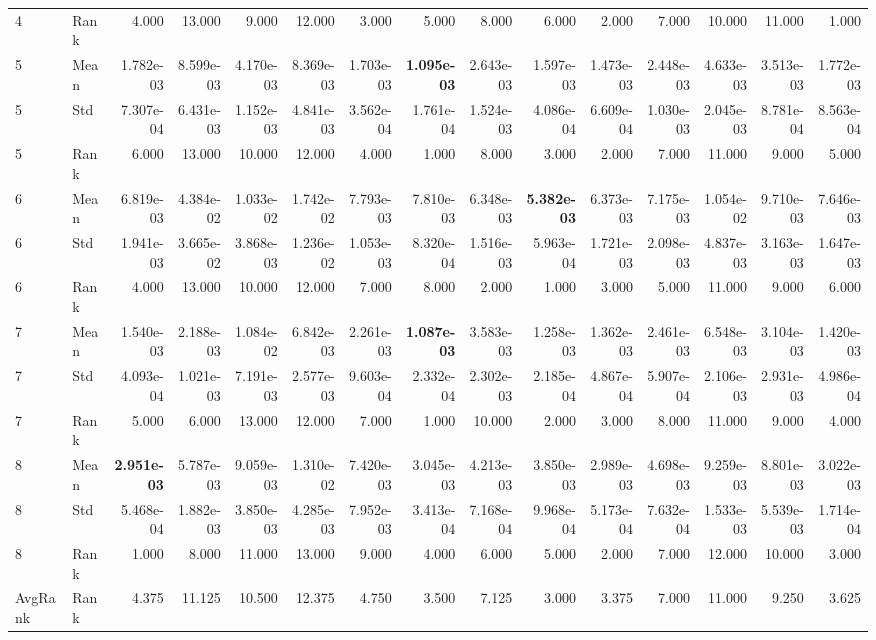 \begin{table}[t]
\begin{tabular}{llrrrrrrrrrrrrr}
4 & Rank & 4.000 & 13.000 & 9.000 & 12.000 & 3.000 & 5.000 & 8.000 & 6.000 & 2.000 & 7.000 & 10.000 & 11.000 & 1.000 \\
5 & Mean & 1.782e-03 & 8.599e-03 & 4.170e-03 & 8.369e-03 & 1.703e-03 & \textbf{1.095e-03} & 2.643e-03 & 1.597e-03 & 1.473e-03 & 2.448e-03 & 4.633e-03 & 3.513e-03 & 1.772e-03 \\
5 & Std & 7.307e-04 & 6.431e-03 & 1.152e-03 & 4.841e-03 & 3.562e-04 & 1.761e-04 & 1.524e-03 & 4.086e-04 & 6.609e-04 & 1.030e-03 & 2.045e-03 & 8.781e-04 & 8.563e-04 \\
5 & Rank & 6.000 & 13.000 & 10.000 & 12.000 & 4.000 & 1.000 & 8.000 & 3.000 & 2.000 & 7.000 & 11.000 & 9.000 & 5.000 \\
6 & Mean & 6.819e-03 & 4.384e-02 & 1.033e-02 & 1.742e-02 & 7.793e-03 & 7.810e-03 & 6.348e-03 & \textbf{5.382e-03} & 6.373e-03 & 7.175e-03 & 1.054e-02 & 9.710e-03 & 7.646e-03 \\
6 & Std & 1.941e-03 & 3.665e-02 & 3.868e-03 & 1.236e-02 & 1.053e-03 & 8.320e-04 & 1.516e-03 & 5.963e-04 & 1.721e-03 & 2.098e-03 & 4.837e-03 & 3.163e-03 & 1.647e-03 \\
6 & Rank & 4.000 & 13.000 & 10.000 & 12.000 & 7.000 & 8.000 & 2.000 & 1.000 & 3.000 & 5.000 & 11.000 & 9.000 & 6.000 \\
7 & Mean & 1.540e-03 & 2.188e-03 & 1.084e-02 & 6.842e-03 & 2.261e-03 & \textbf{1.087e-03} & 3.583e-03 & 1.258e-03 & 1.362e-03 & 2.461e-03 & 6.548e-03 & 3.104e-03 & 1.420e-03 \\
7 & Std & 4.093e-04 & 1.021e-03 & 7.191e-03 & 2.577e-03 & 9.603e-04 & 2.332e-04 & 2.302e-03 & 2.185e-04 & 4.867e-04 & 5.907e-04 & 2.106e-03 & 2.931e-03 & 4.986e-04 \\
7 & Rank & 5.000 & 6.000 & 13.000 & 12.000 & 7.000 & 1.000 & 10.000 & 2.000 & 3.000 & 8.000 & 11.000 & 9.000 & 4.000 \\
8 & Mean & \textbf{2.951e-03} & 5.787e-03 & 9.059e-03 & 1.310e-02 & 7.420e-03 & 3.045e-03 & 4.213e-03 & 3.850e-03 & 2.989e-03 & 4.698e-03 & 9.259e-03 & 8.801e-03 & 3.022e-03 \\
8 & Std & 5.468e-04 & 1.882e-03 & 3.850e-03 & 4.285e-03 & 7.952e-03 & 3.413e-04 & 7.168e-04 & 9.968e-04 & 5.173e-04 & 7.632e-04 & 1.533e-03 & 5.539e-03 & 1.714e-04 \\
8 & Rank & 1.000 & 8.000 & 11.000 & 13.000 & 9.000 & 4.000 & 6.000 & 5.000 & 2.000 & 7.000 & 12.000 & 10.000 & 3.000 \\
AvgRank & Rank & 4.375 & 11.125 & 10.500 & 12.375 & 4.750 & 3.500 & 7.125 & 3.000 & 3.375 & 7.000 & 11.000 & 9.250 & 3.625 \\
\hline
\end{tabular}
\end{table}

